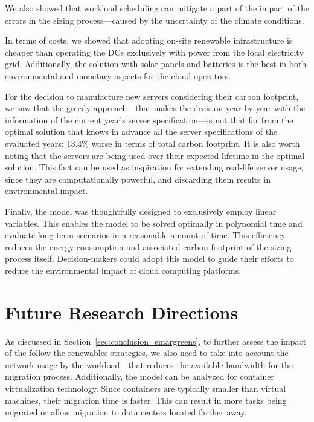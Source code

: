 We also showed that workload scheduling can mitigate a part of the impact of the errors in the sizing process---caused by the uncertainty of the climate conditions. 

In terms of costs, we showed that adopting on-site renewable infrastructure is cheaper than operating the DCs exclusively with power from the local electricity grid. Additionally, the solution with solar panels and batteries is the best in both environmental and monetary aspects for the cloud operators. 

For the decision to manufacture new servers considering their carbon footprint, we saw that the greedy approach---that makes the decision year by year with the information of the current year's server specification---is not that far from the optimal solution that knows in advance all the server specifications of the evaluated years: 13.4\% worse in terms of total carbon footprint. It is also worth noting that the servers are being used over their expected lifetime in the optimal solution. This fact can be used as inspiration for extending real-life server usage, since they are computationally powerful, and discarding them results in environmental impact.

Finally, the model was thoughtfully designed to exclusively employ linear variables. This enables the model to be solved optimally in polynomial time and evaluate long-term scenarios in a reasonable amount of time. This efficiency reduces the energy consumption and associated carbon footprint of the sizing process itself. Decision-makers could adopt this model to guide their efforts to reduce the environmental impact of cloud computing platforms.
\section{Future Research Directions}

\label{sec:conclusion_future_research}

As discussed in Section~\ref{sec:conclusion_smargreens}, to further assess the impact of the follow-the-renewables strategies, we also need to take into account the network usage by the workload---that reduces the available bandwidth for the migration process. Additionally, the model can be analyzed for container virtualization technology. Since containers are typically smaller than virtual machines, their migration time is faster. This can result in more tasks being migrated or allow migration to data centers located farther away.


